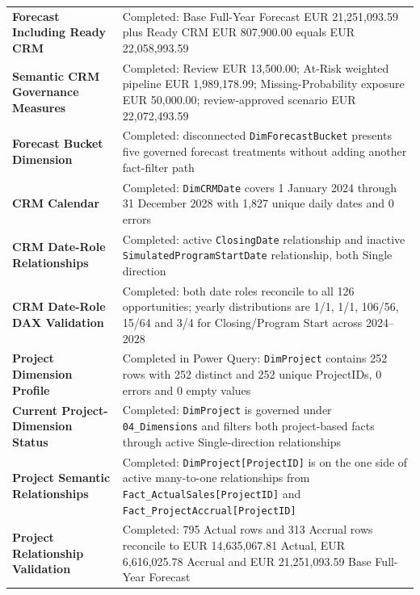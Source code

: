 \documentclass[11pt,a4paper]{article}
\begin{document}
\begin{summarybox}
\begin{tabularx}{\textwidth}{
    >{\bfseries\color{AaltoNavy}}p{4.3cm}
    X
}
Forecast Including Ready CRM
&
Completed: Base Full-Year Forecast EUR 21,251,093.59 plus Ready CRM
EUR 807,900.00 equals EUR 22,058,993.59
\\

Semantic CRM Governance Measures
&
Completed: Review EUR 13,500.00; At-Risk weighted pipeline
EUR 1,989,178.99; Missing-Probability exposure EUR 50,000.00; review-approved
scenario EUR 22,072,493.59
\\

Forecast Bucket Dimension
&
Completed: disconnected \texttt{DimForecastBucket} presents five governed
forecast treatments without adding another fact-filter path
\\

CRM Calendar
&
Completed: \texttt{DimCRMDate} covers 1 January 2024 through
31 December 2028 with 1,827 unique daily dates and 0 errors
\\

CRM Date-Role Relationships
&
Completed: active \texttt{ClosingDate} relationship and inactive
\texttt{SimulatedProgramStartDate} relationship, both Single direction
\\

CRM Date-Role DAX Validation
&
Completed: both date roles reconcile to all 126 opportunities; yearly distributions
are 1/1, 1/1, 106/56, 15/64 and 3/4 for Closing/Program Start across 2024--2028
\\

Project Dimension Profile
&
Completed in Power Query: \texttt{DimProject} contains 252 rows with
252 distinct and 252 unique ProjectIDs, 0 errors and 0 empty values
\\

Current Project-Dimension Status
&
Completed: \texttt{DimProject} is governed under \texttt{04\_Dimensions} and
filters both project-based facts through active Single-direction relationships
\\

Project Semantic Relationships
&
Completed: \texttt{DimProject[ProjectID]} is on the one side of active
many-to-one relationships from \texttt{Fact\_ActualSales[ProjectID]} and
\texttt{Fact\_ProjectAccrual[ProjectID]}
\\

Project Relationship Validation
&
Completed: 795 Actual rows and 313 Accrual rows reconcile to EUR 14,635,067.81
Actual, EUR 6,616,025.78 Accrual and EUR 21,251,093.59 Base Full-Year Forecast
\\


\end{tabularx}
\end{summarybox}
\end{document}
